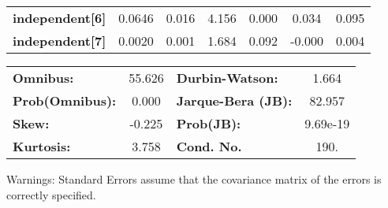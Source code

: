 \begin{center}
\begin{tabular}{lcccccc}
\textbf{independent[6]} &       0.0646  &        0.016     &     4.156  &         0.000        &        0.034    &        0.095     \\
\textbf{independent[7]} &       0.0020  &        0.001     &     1.684  &         0.092        &       -0.000    &        0.004     \\
\bottomrule
\end{tabular}
\begin{tabular}{lclc}
\textbf{Omnibus:}       & 55.626 & \textbf{  Durbin-Watson:     } &    1.664  \\
\textbf{Prob(Omnibus):} &  0.000 & \textbf{  Jarque-Bera (JB):  } &   82.957  \\
\textbf{Skew:}          & -0.225 & \textbf{  Prob(JB):          } & 9.69e-19  \\
\textbf{Kurtosis:}      &  3.758 & \textbf{  Cond. No.          } &     190.  \\
\bottomrule
\end{tabular}
\end{center}

Warnings: \newline
 [1] Standard Errors assume that the covariance matrix of the errors is correctly specified.